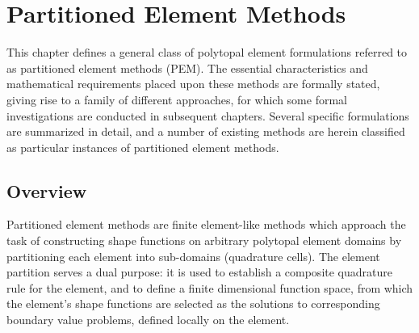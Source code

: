 \chapter{Partitioned Element Methods} \label{ch:pem}
%
This chapter defines a general class of polytopal element formulations referred to as partitioned element methods (PEM). The essential characteristics and mathematical requirements placed upon these methods are formally stated, giving rise to a family of different approaches, for which some formal investigations are conducted in subsequent chapters. Several specific formulations are summarized in detail, and a number of existing methods are herein classified as particular instances of partitioned element methods.

\section{Overview}


Partitioned element methods are finite element-like methods which approach the task of constructing shape functions on arbitrary polytopal element domains by partitioning each element into sub-domains (quadrature cells). The element partition serves a dual purpose: it is used to establish a composite quadrature rule for the element, and to define a finite dimensional function space, from which the element's shape functions are selected as the solutions to corresponding boundary value problems, defined locally on the element.

